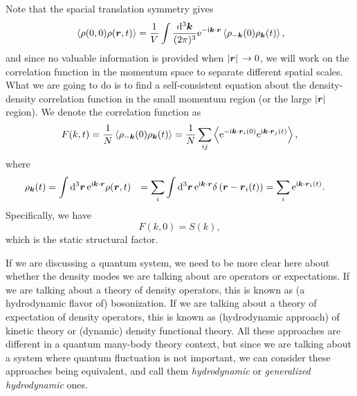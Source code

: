 \documentclass[hyperref, a4paper]{article}
\newcommand*{\ii}{\mathrm{i}}
\newcommand*{\ee}{\mathrm{e}}
\def\\{}%
\begin{document}
Note that the spacial translation symmetry gives 
\begin{equation}
    \expval*{\rho(0, 0) \rho(\vb*{r}, t)} = \frac{1}{V} \int \frac{\dd[3]{\vb*{k}}}{(2\pi)^3} 
    \ee^{- \ii \vb*{k} \cdot \vb*{r}} \expval*{\rho_{-\vb*{k}}(0) \rho_{\vb*{k}}(t)},
\end{equation}
and since no valuable information is provided when $\abs*{\vb*{r}} \to 0$, we will work on the correlation function
in the momentum space to separate different spatial scales.
What we are going to do is to find a self-consistent equation about the density-density correlation function in 
the small momentum region (or the large $\abs*{\vb*{r}}$ region). We denote the correlation function as 
\begin{equation}
    F(k, t)=\frac{1}{N}\left\langle\rho_{-\vb*{k}}(0) \rho_{\vb*{k}}(t)\right\rangle=\frac{1}{N} \sum_{i j}\left\langle \ee^{-\ii \vb*{k} \cdot \vb*{r}_{i}(0)} \ee^{\ii \vb*{k} \cdot \vb*{r}_{j}(t)}\right\rangle,
\end{equation}
where 
\begin{equation}
    \begin{aligned}
        \rho_{\vb*{k}}(t) &= \int \dd[3]{\vb*{r}} \ee^{\ii \vb*{k} \cdot \vb*{r}} \rho(\vb*{r}, t) \\
        &=\sum_{i} \int \dd[3]{\vb*{r}} \ee^{\ii \vb*{k} \cdot \vb*{r}} \delta\left(\vb*{r}-\vb*{r}_{i}(t)\right) \\
        &=\sum_{i} \ee^{\ii \vb*{k} \cdot \vb*{r}_{i}(t)}.
    \end{aligned}
\end{equation}
Specifically, we have 
\begin{equation}
    F(k, 0) = S(k),
\end{equation}
which is the static structural factor.

\begin{note*}{}{}
    If we are discussing a quantum system, we need to be more clear here about whether the density modes we are
    talking about are operators or expectations. If we are talking about a theory of density operators, 
    this is known as (a hydrodynamic flavor of) bosonization. If we are talking about a theory of expectation
    of density operators, this is known as (hydrodynamic approach) of kinetic theory or (dynamic) density 
    functional theory. All these approaches are different in a quantum many-body theory context, but 
    since we are talking about a system where quantum fluctuation is not important, we can consider these 
    approaches being equivalent, and call them \emph{hydrodynamic} or \emph{generalized hydrodynamic} ones. 
\end{note*}
\end{document}
